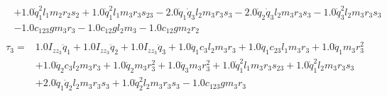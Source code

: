 \begin{align}
\begin{split}
            & + 1.0 \dot{q}_1^{2} l_{1} m_{2} r_{2} s_{2} + 1.0 \dot{q}_1^{2} l_{1} m_{3} r_{3} s_{23} - 2.0 \dot{q}_1 \dot{q}_3 l_{2} m_{3} r_{3} s_{3} - 2.0 \dot{q}_2 \dot{q}_3 l_{2} m_{3} r_{3} s_{3} - 1.0 \dot{q}_3^{2} l_{2} m_{3} r_{3} s_{3} \\
            & - 1.0 c_{123} g m_{3} r_{3} - 1.0 c_{12} g l_{2} m_{3} - 1.0 c_{12} g m_{2} r_{2}
    \end{split}
    \label{eq:3r-dyn-tau-vect-elem2}
    \\
    \begin{split}
        \tau_3 =& 1.0 I_{zz_3} \ddot{q}_1 + 1.0 I_{zz_3} \ddot{q}_2 + 1.0 I_{zz_3} \ddot{q}_3 + 1.0 \ddot{q}_1 c_{3} l_{2} m_{3} r_{3} + 1.0 \ddot{q}_1 c_{23} l_{1} m_{3} r_{3} + 1.0 \ddot{q}_1 m_{3} r_{3}^{2} \\
            & + 1.0 \ddot{q}_2 c_{3} l_{2} m_{3} r_{3} + 1.0 \ddot{q}_2 m_{3} r_{3}^{2} + 1.0 \ddot{q}_3 m_{3} r_{3}^{2} + 1.0 \dot{q}_1^{2} l_{1} m_{3} r_{3} s_{23} + 1.0 \dot{q}_1^{2} l_{2} m_{3} r_{3} s_{3} \\
            & + 2.0 \dot{q}_1 \dot{q}_2 l_{2} m_{3} r_{3} s_{3} + 1.0 \dot{q}_2^{2} l_{2} m_{3} r_{3} s_{3} - 1.0 c_{123} g m_{3} r_{3}
    \end{split}
    \label{eq:3r-dyn-tau-vect-elem3}
\end{align}
